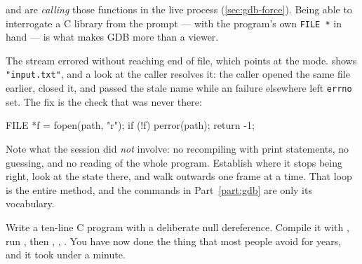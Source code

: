 \begin{note}
	 and  are \emph{calling} those
	functions in the live process (\autoref{sec:gdb-force}). Being able to
	interrogate a C library from the prompt --- with the program's own \texttt{FILE
		*} in hand --- is what makes GDB more than a viewer.
\end{note}

The stream errored without reaching end of file, which points at the mode.
 shows \texttt{"input.txt"}, and a look at the caller resolves it:
the caller opened the same file earlier, closed it, and passed the stale name
while an  failure elsewhere left \texttt{errno} set. The fix is the
check that was never there:

\begin{ccode}
FILE *f = fopen(path, "r");
if (!f) { perror(path); return -1; }
\end{ccode}

\begin{moral}
	Note what the session did \emph{not} involve: no recompiling with print
	statements, no guessing, and no reading of the whole program. Establish where
	it stops being right, look at the state there, and walk outwards one frame at a
	time. That loop is the entire method, and the commands in
	Part~\ref{part:gdb} are only its vocabulary.
\end{moral}

\begin{tryit}
	Write a ten-line C program with a deliberate null dereference. Compile it with
	, run , then , ,
	. You have now done the thing that most people avoid for
	years, and it took under a minute.
\end{tryit}
